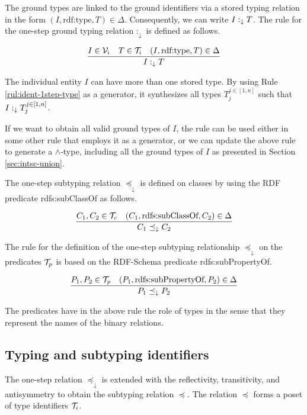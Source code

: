 \documentclass[runningheads]{llncs}
\newcommand{\darr}{\downarrow}
\newcommand{\V}{{\cal V}}
\newcommand{\T}{{\cal T}}
\begin{document}
The ground types are linked to the ground identifiers via a stored
typing relation in the form
$(I,\text{rdf:type},T)\in\Delta$. Consequently, we can write
$I:_\darr\/T$. The rule for the one-step ground typing relation
$:_\darr$ is defined as follows.

\begin{equation}
\label{rul:ident-1step-type}
\dfrac{I\in\V_i\quad T\in\T_i\quad (I,\text{rdf:type},T)\in\D}
      {I :_\darr T}
\end{equation}

The individual entity $I$ can have more than one stored type. By
using Rule \ref{rul:ident-1step-type} as a generator, it synthesizes
all types $T_j^{j\in[1,n]}$ such that $I:_\darr\/T_j^{j\in[1,n]}$.

If we want to obtain all valid ground types of $I$, the rule can be
used either in some other rule that employs it as a generator, or we
can update the above rule to generate a $\land$-type, including all
the ground types of $I$ as presented in Section \ref{sec:intsc-union}.

The one-step subtyping relation $\preceq_\darr$ is defined on
classes by using the RDF predicate rdfs:sub\-ClassOf as follows.

\begin{equation}
\label{rul:ident-1step-subtype}
\dfrac{C_1,C_2\in\T_c\quad (C_1,\text{rdfs:subClassOf},C_2)\in\D}
{C_1 \preceq_\darr\/C_2}
\end{equation}

The rule for the definition of the one-step subtyping relationship
$\preceq_\darr$ on the predicates $\T_p$ is based on the RDF-Schema
predicate rdfs:subPropertyOf.

\begin{equation}
\dfrac{P_1,P_2\in\T_p \quad (P_1,\text{rdfs:subPropertyOf},P_2)\in\D}
      {P_1\preceq_\darr\/P_2}
\end{equation}

The predicates have in the above rule the role of types in the sense
that they represent the names of the binary relations. 



\subsection{Typing and subtyping identifiers\label{sec:idents-typing}}

The one-step relation $\preceq_\darr$ is extended with the
reflectivity, transitivity, and antisymmetry to obtain the subtyping
relation $\preceq$. The relation $\preceq$ forms a poset of type
identifiers $\T_i$.
\end{document}
